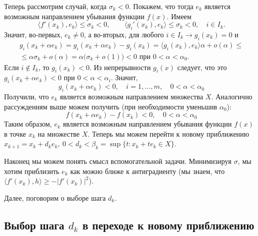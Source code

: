 \documentclass{article}
\theoremstyle{plain}
\theoremstyle{definition}
\begin{document}
Теперь рассмотрим случай, когда $\sigma_k < 0$.
Покажем, что тогда $e_k$ является возможным направлением убывания функции $f(x)$. Имеем
\begin{equation*}
\langle f'(x_k), e_k \rangle \leqslant \sigma_k < 0, \qquad \langle g_i'(x_k),e_k \rangle \leqslant \sigma_k < 0,\quad i \in I_k.
\end{equation*}
Значит, во-первых, $e_k \neq 0$, а во-вторых, для любого $i \in I_k \rightarrow g_i(x_k) = 0$ и
\begin{multline}
g_i(x_k+\alpha e_k) = g_i(x_k+\alpha e_k) - g_i(x_k) = \langle g_i(x_k), e_k \rangle \alpha + o(\alpha) \leqslant
\\
\leqslant \alpha \sigma_k + o(\alpha) = \alpha \big(\sigma_k + o(1) \big) < 0 \text{ при } 0 < \alpha < \alpha_0.
\end{multline}
Если $i \notin I_k$, то $g_i(x_k) < 0$. Из непрерывности $g_i(x)$ следует, что это $g_i(x_k+\alpha e_k) < 0$ при $0<\alpha<\alpha_i$. Значит,
\begin{equation}
g_i(x_k+\alpha e_k) < 0, \quad i = 1,\ldots,m,\quad 0<\alpha<\alpha_0
\end{equation}
Получили, что $e_k$ является возможным направлением множества $X$. Аналогично рассуждениям выше можем получить (при необходимости уменьшив $\alpha_0$):
\begin{equation}
f(x_k+\alpha e_k) - f(x_k) < 0,\quad 0 < \alpha < \alpha_0
\end{equation}
Таким образом, $e_k$ является возможным направлением убывания функции $f(x)$ в точке $x_k$ на множестве $X$.
Теперь мы можем перейти к новому приближению $x_{k+1} = x_k + d_k e_k,~ 0 < d_k < \beta_k=\sup \lbrace t: x_k+te_k \in X \rbrace$.

Наконец мы можем понять смысл вспомогательной задачи. Минимизируя $\sigma$, мы хотим приблизить $e_k$ как можно ближе к антиградиенту (мы знаем, что $\langle f'(x_k), h \rangle \geqslant -|f'(x_k)|^2$).

Далее, поговорим о выборе шага $d_k$.

\subsection{Выбор шага $d_k$ в переходе к новому приближению}
\label{choose_step_sec}
\end{document}
